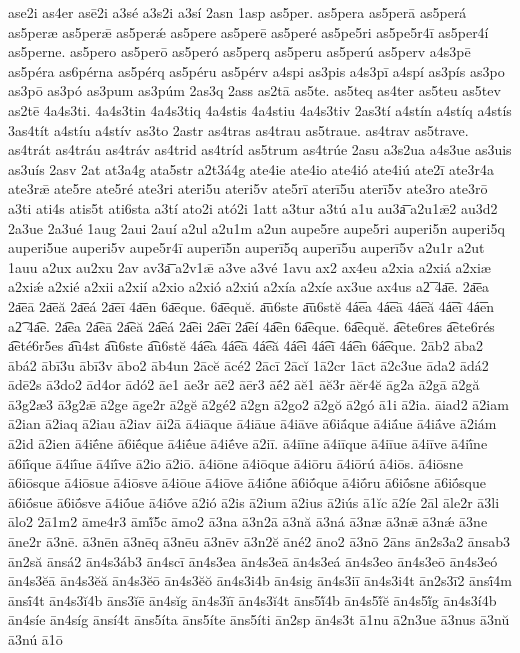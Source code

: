 {ase2i
as4er
asē2i
a3sé
a3s2i
a3sí
2asn
1asp
as5per.
as5pera
as5perā
as5perá
as5peræ
as5perǣ
as5perǽ
as5pere
as5perē
as5peré
as5pe5ri
as5pe5r4ī
as5per4í
as5perne.
as5pero
as5perō
as5peró
as5perq
as5peru
as5perú
as5perv
a4s3pē
as5péra
as6pérna
as5pérq
as5péru
as5pérv
a4spi
as3pis
a4s3pī
a4spí
as3pís
as3po
as3pō
as3pó
as3pum
as3púm
2as3q
2ass
as2tā
as5te.
as5teq
as4ter
as5teu
as5tev
as2tē
4a4s3ti.
4a4s3tin
4a4s3tiq
4a4stis
4a4stiu
4a4s3tiv
2as3tí
a4stín
a4stíq
a4stís
3as4tít
a4stíu
a4stív
as3to
2astr
as4tras
as4trau
as5traue.
as4trav
as5trave.
as4trát
as4tráu
as4tráv
as4trid
as4tríd
as5trum
as4trúe
2asu
a3s2ua
a4s3ue
as3uis
as3uís
2asv
2at
at3a4g
ata5str
a2t3á4g
ate4ie
ate4io
ate4ió
ate4iú
ate2ī
ate3r4a
ate3rǣ
ate5re
ate5ré
ate3ri
ateri5u
ateri5v
ate5rī
aterī5u
aterī5v
ate3ro
ate3rō
a3ti
ati4s
atis5t
ati6sta
a3tí
ato2i
ató2i
1att
a3tur
a3tú
a1u
au3a͞
a2u1ǣ2
au3d2
2a3ue
2a3ué
1aug
2aui
2auí
a2ul
a2u1m
a2un
aupe5re
aupe5ri
auperi5n
auperi5q
auperi5ue
auperi5v
aupe5r4ī
auperī5n
auperī5q
auperī5u
auperī5v
a2u1r
a2ut
1auu
a2ux
au2xu
2av
av3a͞
a2v1ǣ
a3ve
a3vé
1avu
ax2
ax4eu
a2xia
a2xiá
a2xiæ
a2xiǽ
a2xié
a2xii
a2xií
a2xio
a2xió
a2xiú
a2xía
a2xíe
ax3ue
ax4us
a2͞
4a͞e.
2a͞ea
2a͞eā
2a͞eă
2a͞eá
2a͞eī
4a͞en
6a͞eque.
6a͞equĕ.
a͞u6ste
a͞u6stĕ
4á͞ea
4á͞eā
4á͞eă
4á͞eī
4á͞en
a2͡
4a͡e.
2a͡ea
2a͡eā
2a͡eă
2a͡eá
2a͡ei
2a͡eī
2a͡eí
4a͡en
6a͡eque.
6a͡equĕ.
a͡ete6res
a͡ete6rés
a͡eté6r5es
a͡u4st
a͡u6ste
a͡u6stĕ
4á͡ea
4á͡eā
4á͡eă
4á͡ei
4á͡eī
4á͡en
6á͡eque.
2āb2
āba2
ābá2
ābī3u
ābī3v
ābo2
āb4un
2ācĕ
ācé2
2ācī
2ācĭ
1ā2cr
1āct
ā2c3ue
āda2
ādá2
ādē2s
ā3do2
ād4or
ādó2
āe1
āe3r
āē2
āēr3
āḗ2
āĕ1
āĕ3r
āĕr4ĕ
āg2a
ā2gā
ā2gă
ā3g2æ3
ā3g2ǣ
ā2ge
āge2r
ā2gĕ
ā2gé2
ā2gn
ā2go2
ā2gŏ
ā2gó
ā1i
ā2ia.
āiad2
ā2iam
ā2ian
ā2iaq
ā2iau
ā2iav
āi2ā
ā4iāque
ā4iāue
ā4iāve
ā6iā́que
ā4iā́ue
ā4iā́ve
ā2iám
ā2id
ā2ien
ā4iḗne
ā6iḗque
ā4iḗue
ā4iḗve
ā2iī.
ā4iīne
ā4iīque
ā4iīue
ā4iīve
ā4iī́ne
ā6iī́que
ā4iī́ue
ā4iī́ve
ā2io
ā2iō.
ā4iōne
ā4iōque
ā4iōru
ā4iōrú
ā4iōs.
ā4iōsne
ā6iōsque
ā4iōsue
ā4iōsve
ā4iōue
ā4iōve
ā4iṓne
ā6iṓque
ā4iṓru
ā6iṓsne
ā6iṓsque
ā6iṓsue
ā6iṓsve
ā4iṓue
ā4iṓve
ā2ió
ā2is
ā2ium
ā2ius
ā2iús
ā1ĭc
ā2íe
2āl
āle2r
ā3li
ālo2
2ā1m2
āme4r3
āmĭ́5c
āmo2
ā3na
ā3n2ā
ā3nă
ā3ná
ā3næ
ā3nǣ
ā3nǽ
ā3ne
āne2r
ā3nē.
ā3nēn
ā3nēq
ā3nēu
ā3nēv
ā3n2ĕ
āné2
āno2
ā3nō
2āns
ān2s3a2
ānsab3
ān2să
ānsá2
ān4s3áb3
ān4scī
ān4s3ea
ān4s3eā
ān4s3eá
ān4s3eo
ān4s3eō
ān4s3eó
ān4s3ĕā
ān4s3ĕă
ān4s3ĕō
ān4s3ĕŏ
ān4s3i4b
ān4sig
ān4s3iī
ān4s3i4t
ān2s3ī2
ānsī́4m
ānsī́4t
ān4s3ĭ4b
āns3ĭē
ān4sĭg
ān4s3ĭī
ān4s3ĭ4t
āns5ĭ́4b
ān4s5ĭ́ĕ
ān4s5ĭ́g
ān4s3í4b
ān4síe
ān4síg
ānsí4t
āns5íta
āns5íte
āns5íti
ān2sp
ān4s3t
ā1nu
ā2n3ue
ā3nus
ā3nŭ
ā3nú
ā1ō
}
